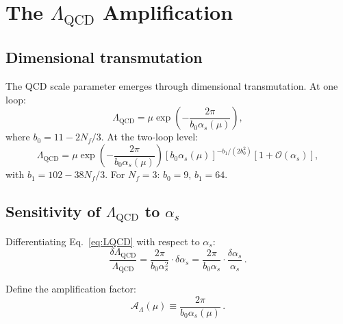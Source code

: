 \documentclass[aps,prd,twocolumn,superscriptaddress,floatfix,nofootinbib]{revtex4-2}
\renewcommand{\order}[1]{\mathcal{O}\!\left(#1\right)}
\newcommand{\LQCD}{\Lambda_{\mathrm{QCD}}}
\newcommand{\as}{\alpha_s}
\begin{document}
\section{The $\LQCD$ Amplification}\label{sec:lambda_amp}

\subsection{Dimensional transmutation}\label{sec:dim_trans}

The QCD scale parameter emerges through dimensional transmutation. At one
loop:
\begin{equation}
\LQCD = \mu \exp\!\left(-\frac{2\pi}{b_0 \as(\mu)}\right) , \label{eq:LQCD}
\end{equation}
where $b_0 = 11 - 2N_f/3$. At the two-loop level:
\begin{equation}
\LQCD = \mu \exp\!\left(-\frac{2\pi}{b_0 \as(\mu)}\right)
\left[b_0 \as(\mu)\right]^{-b_1/(2b_0^2)}
\left[1 + \order{\as}\right] ,
\label{eq:LQCD_2loop}
\end{equation}
with $b_1 = 102 - 38N_f/3$. For $N_f = 3$: $b_0 = 9$, $b_1 = 64$.

\subsection{Sensitivity of $\LQCD$ to $\as$}\label{sec:LQCD_sens}

Differentiating Eq.~\eqref{eq:LQCD} with respect to $\as$:
\begin{equation}
\frac{\delta\LQCD}{\LQCD} = \frac{2\pi}{b_0 \as^2}
\cdot \delta\as = \frac{2\pi}{b_0 \as} \cdot
\frac{\delta\as}{\as} \, .
\label{eq:LQCD_deriv}
\end{equation}

Define the amplification factor:
\begin{equation}
\mathcal{A}_\Lambda(\mu) \equiv \frac{2\pi}{b_0 \as(\mu)} \, .
\label{eq:amp_factor}
\end{equation}
\end{document}
